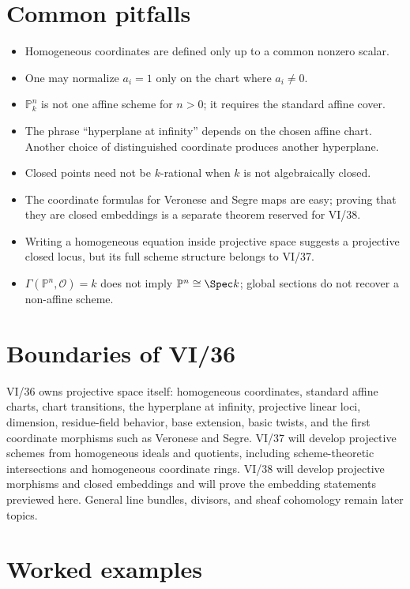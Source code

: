 \section{Common pitfalls}
\begin{itemize}
\item Homogeneous coordinates are defined only up to a common nonzero scalar.
\item One may normalize \(a_i=1\) only on the chart where \(a_i\ne0\).
\item \(\mathbb P^n_k\) is not one affine scheme for \(n>0\); it requires the standard affine cover.
\item The phrase ``hyperplane at infinity'' depends on the chosen affine chart.  Another choice of distinguished coordinate produces another hyperplane.
\item Closed points need not be \(k\)-rational when \(k\) is not algebraically closed.
\item The coordinate formulas for Veronese and Segre maps are easy; proving that they are closed embeddings is a separate theorem reserved for VI/38.
\item Writing a homogeneous equation inside projective space suggests a projective closed locus, but its full scheme structure belongs to VI/37.
\item \(\Gamma(\mathbb P^n,\mathcal O)=k\) does not imply \(\mathbb P^n\cong\Spec k\); global sections do not recover a non-affine scheme.
\end{itemize}

\section{Boundaries of VI/36}
VI/36 owns projective space itself: homogeneous coordinates, standard affine charts, chart transitions, the hyperplane at infinity, projective linear loci, dimension, residue-field behavior, base extension, basic twists, and the first coordinate morphisms such as Veronese and Segre.  VI/37 will develop projective schemes from homogeneous ideals and quotients, including scheme-theoretic intersections and homogeneous coordinate rings.  VI/38 will develop projective morphisms and closed embeddings and will prove the embedding statements previewed here.  General line bundles, divisors, and sheaf cohomology remain later topics.

\section{Worked examples}



